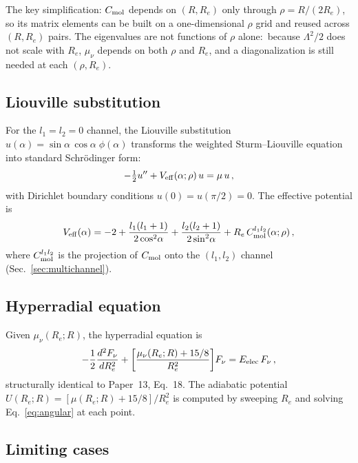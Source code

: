 \documentclass[aps,pra,twocolumn,superscriptaddress,longbibliography]{revtex4-2}
\begin{document}
The key simplification: $C_{\rm mol}$ depends on $(R,R_e)$
only through $\rho = R/(2R_e)$, so its matrix elements can be built
on a one-dimensional $\rho$ grid and reused across $(R,R_e)$ pairs.
The eigenvalues are not functions of $\rho$ alone:\ because
$\Lambda^2/2$ does not scale with $R_e$, $\mu_\nu$ depends on both
$\rho$ and $R_e$, and a diagonalization is still needed at each
$(\rho, R_e)$.

\subsection{Liouville substitution}

For the $l_1 = l_2 = 0$ channel, the Liouville substitution
$u(\alpha) = \sin\alpha\,\cos\alpha\;\phi(\alpha)$ transforms
the weighted Sturm--Liouville equation into standard Schr\"odinger form:
\begin{equation}
  -\tfrac{1}{2}u'' + V_{\rm eff}(\alpha;\rho)\,u = \mu\,u\,,
  \label{eq:liouville}
\end{equation}
with Dirichlet boundary conditions $u(0) = u(\pi/2) = 0$.  The
effective potential is
\begin{equation}
  V_{\rm eff}(\alpha) = -2
    + \frac{l_1(l_1+1)}{2\cos^2\!\alpha}
    + \frac{l_2(l_2+1)}{2\sin^2\!\alpha}
    + R_e\,C_{\rm mol}^{l_1 l_2}(\alpha;\rho)\,,
  \label{eq:Veff_alpha}
\end{equation}
where $C_{\rm mol}^{l_1 l_2}$ is the projection of $C_{\rm mol}$ onto
the $(l_1,l_2)$ channel (Sec.~\ref{sec:multichannel}).

\subsection{Hyperradial equation}

Given $\mu_\nu(R_e;R)$, the hyperradial equation is
\begin{equation}
  -\frac{1}{2}\frac{d^2 F_\nu}{dR_e^2}
  + \biggl[\frac{\mu_\nu(R_e;R) + 15/8}{R_e^2}\biggr]F_\nu
  = E_{\rm elec}\,F_\nu\,,
  \label{eq:radial}
\end{equation}
structurally identical to Paper~13, Eq.~18.  The adiabatic potential
$U(R_e;R) = [\mu(R_e;R) + 15/8]/R_e^2$ is computed by sweeping $R_e$
and solving Eq.~\eqref{eq:angular} at each point.

\subsection{Limiting cases}
\end{document}

